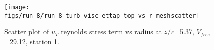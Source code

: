 \begin{figure}[H]
\centering
\texttt{[image: figs/run\_8/run\_8\_turb\_visc\_ettap\_top\_vs\_r\_meshscatter]}
\caption{Scatter plot of $
u_T$ reynolds stress term vs radius at $z/c$=5.37, $V_{free}$=29.12, station 1.}
\label{fig:run_8_turb_visc_ettap_top_vs_r_meshscatter}
\end{figure}


